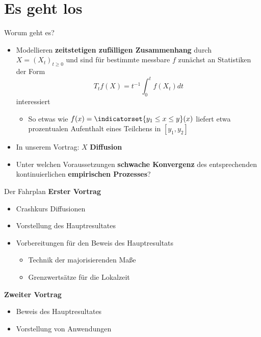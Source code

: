 \section{Es geht los}

\begin{frame}{Worum geht es?}
    \begin{itemize}
    \item Modellieren \textbf{zeitstetigen zufälligen Zusammenhang} durch $X = (X_t)_{t \geq 0}$ und sind für bestimmte messbare $f$ zunächst an Statistiken der Form \[T_tf(X) = t^{-1}\int_0^t f(X_t) dt\] interessiert
    \pause
    \begin{itemize}
        \item So etwas wie $f(x) = \indicatorset{y_1 \leq x\leq y}(x)$ liefert etwa prozentualen Aufenthalt eines Teilchens in $[y_1, y_2]$ 
    \end{itemize}
    \pause
    \item In unserem Vortrag: $X$ \textbf{Diffusion}
    \item Unter welchen Voraussetzungen \textbf{schwache Konvergenz} des entsprechenden kontinuierlichen \textbf{empirischen Prozesses}?
    \end{itemize}
\end{frame}

\begin{frame}{Der Fahrplan}
\textbf{Erster Vortrag} \normalsize
\begin{itemize}
    \item Crashkurs Diffusionen
    \item Vorstellung des Hauptresultates
    \item Vorbereitungen für den Beweis des Hauptresultats
    \begin{itemize}
        \item Technik der majorisierenden Maße
        \item Grenzwertsätze für die Lokalzeit
    \end{itemize}
\end{itemize}    
\textbf{Zweiter Vortrag} \normalsize
\begin{itemize}
    \item Beweis des Hauptresultates
    \item Vorstellung von Anwendungen
\end{itemize}
\end{frame}


